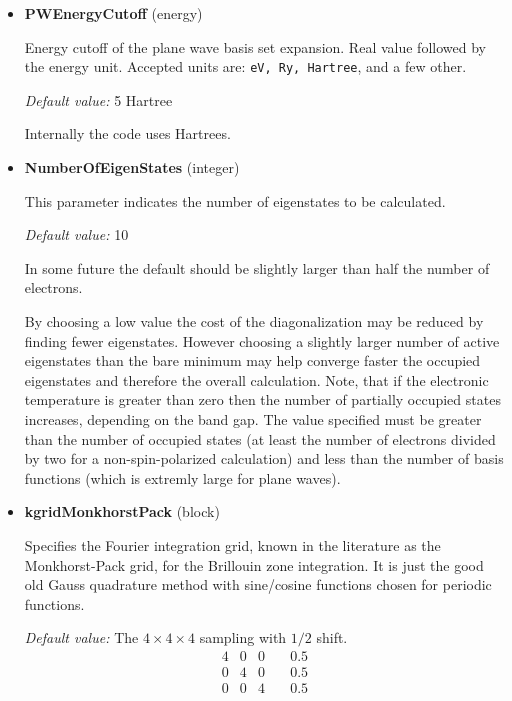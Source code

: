 \documentclass[11pt]{article}
\begin{document}
\begin{itemize}

\item{\bf PWEnergyCutoff} (energy)

  Energy cutoff of the plane wave basis set expansion.  Real value followed
  by the energy unit.
  Accepted units are: \texttt{eV, Ry, Hartree}, and a few other.

  \textit{Default value:}  5 Hartree

  Internally the code uses Hartrees.


\item{\bf NumberOfEigenStates} (integer)

  This parameter indicates the number of eigenstates
  to be calculated.

  \textit{Default value:}  10

  In some future the default should be slightly larger than half the number of electrons.

  By choosing a low value the cost of the diagonalization
  may be reduced by finding fewer eigenstates.
  However choosing a slightly larger number of active eigenstates
  than the bare minimum may help converge faster the occupied
  eigenstates and therefore the overall calculation.
  Note, that if the electronic temperature is greater than zero then
  the number of partially occupied states increases, depending on the band gap.
  The value specified must be greater than the number of occupied states
  (at least the number of electrons divided by two for
  a non-spin-polarized calculation) and
  less than the number of basis functions (which is extremly large for plane waves).

\item{\bf kgridMonkhorstPack} (block)

  Specifies the Fourier integration grid, known in the literature as the Monkhorst-Pack
  grid, for the Brillouin zone integration.  It is just the good old Gauss quadrature method
  with sine/cosine functions chosen for periodic functions.

  \textit{Default value:}  The $4\times4\times4$ sampling with $1/2$ shift.
  \begin{equation*}
      \begin{matrix}
        4  &  0  &  0  & \quad  0.5 \\
        0  &  4  &  0  & \quad  0.5 \\
        0  &  0  &  4  & \quad  0.5 \\
      \end{matrix}
  \end{equation*}


\end{itemize}
\end{document}
